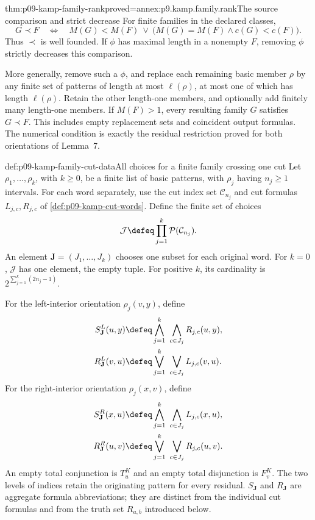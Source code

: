\begin{hblemma}{thm:p09-kamp-family-rank}{proved=annex:p9.kamp.family.rank}{The source comparison and strict decrease}
For finite families in the declared classes,
\[
 G\prec F\quad\Longleftrightarrow\quad
 M(G)<M(F)\ \lor\
       \bigl(M(G)=M(F)\land c(G)<c(F)\bigr).
\]
Thus \(\prec\) is well founded. If \(\phi\) has maximal
length in a nonempty \(F\), removing \(\phi\) strictly
decreases this comparison.

More generally, remove such a \(\phi\), and replace each remaining
basic member \(\rho\) by any finite set of patterns of length at
most \(\ell(\rho)\), at most one of which has length
\(\ell(\rho)\). Retain the other length-one members, and
optionally add finitely many length-one members. If \(M(F)>1\),
every resulting family \(G\) satisfies \(G\prec F\).
This includes empty replacement sets and coincident output formulas.
The numerical condition is exactly the residual restriction proved for
both orientations of Lemma~7.
\end{hblemma}

\begin{hbdefinition}{def:p09-kamp-family-cut-data}{All choices for a finite family crossing one cut}
Let \(\rho_1,\ldots,\rho_k\), with \(k\geq0\), be
a finite list of basic patterns, with \(\rho_j\) having
\(n_j\geq1\) intervals. For each word separately, use the
cut index set \(\mathcal C_{n_j}\) and cut formulas
\(L_{j,c},R_{j,c}\) of \cref{def:p09-kamp-cut-words}.
Define the finite set of choices
\[
 \mathcal J\defeq\prod_{j=1}^k\mathcal P(\mathcal C_{n_j}).
\]
An element \(\mathbf J=(J_1,\ldots,J_k)\) chooses one
subset for each original word. For \(k=0\), \(\mathcal J\)
has one element, the empty tuple. For positive \(k\), its
cardinality is \(2^{\sum_{j=1}^k(2n_j-1)}\).

For the left-interior orientation \(\rho_j(v,y)\), define
\[
\begin{aligned}
 S_{\mathbf J}^L(u,y)&\defeq
                  \bigwedge_{j=1}^k\ \bigwedge_{c\in J_j}R_{j,c}(u,y),\\
 R_{\mathbf J}^L(v,u)&\defeq
                  \bigvee_{j=1}^k\ \bigvee_{c\in J_j}L_{j,c}(v,u).
\end{aligned}
\]
For the right-interior orientation \(\rho_j(x,v)\), define
\[
\begin{aligned}
 S_{\mathbf J}^R(x,u)&\defeq
                  \bigwedge_{j=1}^k\ \bigwedge_{c\in J_j}L_{j,c}(x,u),\\
 R_{\mathbf J}^R(u,v)&\defeq
                  \bigvee_{j=1}^k\ \bigvee_{c\in J_j}R_{j,c}(u,v).
\end{aligned}
\]
An empty total conjunction is \(T^K_u\) and an empty total
disjunction is \(F^K_v\). The two levels of indices retain
the originating pattern for every residual. \(S_{\mathbf J}\)
and \(R_{\mathbf J}\) are aggregate formula abbreviations;
they are distinct from the individual cut formulas and from the
truth set \(R_{a,b}\) introduced below.
\end{hbdefinition}


